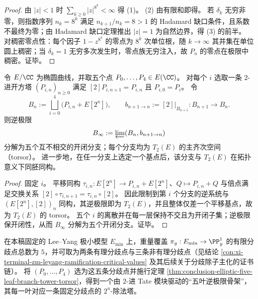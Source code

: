 \begin{proof}
由 \(|z|<1\) 时 \(\sum_{k\ge 0}|z|^{8^k}<\infty\) 得 (1)。
(2) 由有限和即得。
若 \(\delta_k\) 无穷非零，则指数序列 \(n_k=8^k\) 满足 \(n_{k+1}/n_k=8>1\) 的 Hadamard 缺口条件，且系数不最终为零；由 Hadamard 缺口定理推出 \(|z|=1\) 为自然边界，得 (3) 的前半。
对稠密零点性：每个因子 \(1-z^{8^k}\) 的零点为 \(8^k\) 次单位根，随 \(k\to\infty\) 其并集在单位圆上稠密；当 \(\delta_k=1\) 无穷多次发生时，零点族无穷注入，故 \(P_n\) 的零点在极限中稠密。证毕。
\end{proof}

\begin{theorem}\label{thm:conclusion-elliptic-five-leaf-branch-tower-torsor}
令 \(E/\CC\) 为椭圆曲线，并取五个点 \(P_0,\dots,P_4\in E(\CC)\)。
对每个 \(i\) 选取一条 \(2\)-进开方塔 \((P_{i,n})_{n\ge 0}\) 满足 \([2]P_{i,n+1}=P_{i,n}\) 且 \(P_{i,0}=P_i\)。
令
\[
B_n:=\bigsqcup_{i=0}^{4}\bigl(P_{i,n}+E[2^n]\bigr),
\qquad
b_{n+1\to n}:=[2]\big|_{B_{n+1}}:B_{n+1}\to B_n.
\]
则逆极限
\[
B_\infty:=\varprojlim(B_n,b_{n+1\to n})
\]
分解为五个互不相交的开闭分支；每个分支均为 \(T_2(E)\) 的主齐次空间（torsor）。
进一步地，在任一分支上选定一个基点后，该分支与 \(T_2(E)\) 在拓扑意义下同胚同构。
\end{theorem}

\begin{proof}
固定 \(i\)。
平移同构 \(\tau_{i,n}:E[2^n]\to P_{i,n}+E[2^n]\)、\(Q\mapsto P_{i,n}+Q\) 与倍点满足交换关系
\(
[2]\circ\tau_{i,n+1}=\tau_{i,n}\circ[2]
\)。
因此限制到第 \(i\) 个分支的逆系统与 \((E[2^n],[2])_n\) 同构，其逆极限即为 \(T_2(E)\)，并且整体仅差一个平移基点，故为 \(T_2(E)\) 的 torsor。
五个 \(i\) 的离散并在每一层保持不交且为开闭子集；逆极限保开闭性，从而 \(B_\infty\) 分解为五个开闭分支。证毕。
\end{proof}

\begin{remark}\label{rem:conclusion-elliptic-five-leaf-leyang-alignment}
在本稿固定的 Lee--Yang 极小模型 \(E_{\min}\) 上，重量覆盖 \(\pi_y:E_{\min}\to\PP^1_y\) 的有限分歧点总数为 \(5\)，并可取为两条有理分歧点与三条非有理分歧点（见结论 \ref{con:xi-terminal-zm-leyang-ramification-critical-values} 及其后续关于分歧除子主化的证书链）。
将 \((P_0,\dots,P_4)\) 选为这五条分歧点并施行定理 \ref{thm:conclusion-elliptic-five-leaf-branch-tower-torsor}，得到一个由 \(2\)-进 Tate 模块驱动的“五叶逆极限骨架”，其每一叶对应一条固定分歧点的 \(2^n\)-除法塔。
\end{remark}

\endinput
